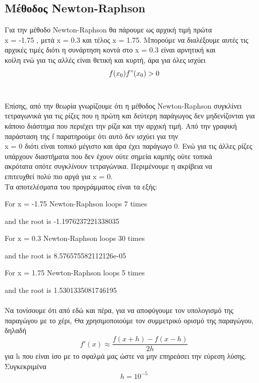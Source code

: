 \documentclass[a4paper,11pt]{article}
\newcommand{\lt}{\latintext}
\newcommand{\gt}{\greektext}
\begin{document}
	\subsection{Μέθοδος \lt Newton-Raphson}
\normalsize{Για την μέθοδο \lt Newton-Raphson \gt θα πάρουμε
ως αρχική τιμή πρώτα \\ \lt x =  -1.75 \gt , μετά \lt x = 0.3 \gt 
και τέλος \lt x = 1.75. \gt Μπορούμε να διαλέξουμε αυτές τις αρχικές
τιμές διότι η συνάρτηση κοντά στο \lt x = 0.3 \gt είναι αρνητική και
\\κοίλη ενώ για τις αλλές είναι θετική και κυρτή, 
άρα για όλες ισχύει}
\\
\begin{equation*}
	f(x_0)f"(x_0) > 0
\end{equation*}
\\
\normalsize{ Επίσης, από την θεωρία γνωρίζουμε ότι η
μέθοδος \lt Newton-Raphson \gt συγκλίνει τετραγωνικά για τις ρίζες
που η πρώτη και δεύτερη παράγωγος δεν μηδενίζονται για κάποιο
διάστημα που περιέχει την ρίζα και την αρχική τιμή. Από την γραφική
παράσταση της \lt f \gt παρατηρούμε ότι αυτό δεν ισχύει για την \lt 
\\ x = 0 \gt διότι είναι τοπικό μέγιστο και άρα έχει παράγωγο 0. Ενώ
για τις άλλες ρίζες υπάρχουν διαστήματα που δεν έχουν ούτε σημεία
καμπής ούτε τοπικά \\ ακρότατα οπότε συγκλίνουν τετραγώνικα.
Περιμένουμε η ακρίβεια να \\επιτευχθεί πολύ πιο αργά για \lt x = 0. 
\gt \\Τα αποτελέσματα του προγράμματος είναι τα εξής: 
\par\lt For x = -1.75 Newton-Raphson loops 7 times 
\par and the root is -1.1976237221338035
\par For x =  0.3 Newton-Raphson loops 30 times 
\par and the root is 8.576575582112126e-05
\par For x =  1.75 Newton-Raphson loops 5 times 
\par and the root is 1.5301335081746195
\\
\\ \gt Να τονίσουμε ότι από εδώ και πέρα, για να αποφύγουμε τον
υπολογισμό της παραγώγου με το χέρι, Θα χρησιμοποιούμε
τον συμμετρικό ορισμό της παραγώγου, δηλαδή 
\begin{equation*}
	f'(x) \approx \frac{f(x+h)-f(x-h)}{2h}
\end{equation*} 
για \lt h \gt που είναι ίσο με το σφαλμά μας ώστε να
μην επηρεάσει την εύρεση λύσης. Συγκεκριμένα 
\begin{equation*}
	h = 10^{-5}
\end{equation*}}
\end{document}
